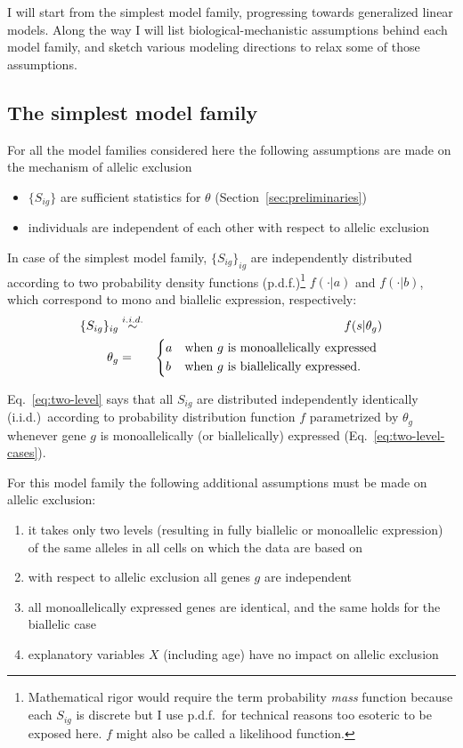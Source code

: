 \documentclass[letterpaper]{article}
\begin{document}
I will start from the simplest model family, progressing towards generalized
linear models.  Along the way I will list biological-mechanistic assumptions
behind each model family, and sketch various modeling directions to relax some
of those assumptions.

\subsection{The simplest model family}

For all the model families considered here the following assumptions are made
on the mechanism of allelic exclusion
\begin{itemize}
\item $\{S_{ig}\}$ are sufficient statistics for $\theta$
(Section~\ref{sec:preliminaries})
\item individuals are independent of each other with respect to allelic
exclusion
\end{itemize}

In case of the simplest model family, $\{S_{ig}\}_{ig}$ are independently
distributed according to two probability density functions
(p.d.f.)\footnote{Mathematical rigor would require the term probability
\emph{mass} function because each \(S_{ig}\) is discrete but I use p.d.f.~for
technical reasons too esoteric to be exposed here.  \(f\) might also be called
a likelihood function. } $f(\cdot|a)$ and $f(\cdot|b)$, which correspond to
mono and biallelic expression, respectively:
\begin{eqnarray}
\label{eq:two-level}
\{S_{ig}\}_{ig} &\overset{i.i.d.}{\sim}& f(s | \theta_g) \\
\label{eq:two-level-cases}
\theta_g &=&
\begin{dcases*}
a & when $g$ is monoallelically expressed \\
b & when $g$ is biallelically expressed.
\end{dcases*}
\end{eqnarray}

Eq.~\ref{eq:two-level} says that all \(S_{ig}\) are distributed independently
identically (i.i.d.)~according to probability distribution function \(f\)
parametrized by \(\theta_g\) whenever gene \(g\) is monoallelically (or
biallelically) expressed (Eq.~\ref{eq:two-level-cases}).

For this model family the following additional assumptions must be made on
allelic exclusion:
\begin{enumerate}
\item it takes only two levels (resulting in fully biallelic or monoallelic
expression) of the same alleles in all cells on which the data are based on
\item with respect to allelic exclusion all genes $g$ are independent
\item all monoallelically expressed genes are identical, and the
same holds for the biallelic case
\item explanatory variables $X$ (including age) have no impact on allelic
exclusion
\end{enumerate}
\end{document}
